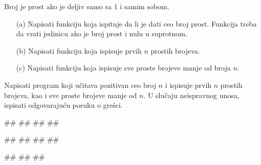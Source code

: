 \begin{Exercise}[label=FUN_08] 
Broj je prost ako je deljiv samo sa $1$ i samim sobom. 
\begin{itemize}
 \item [(a)] Napisati funkciju  koja ispituje da li je dati ceo
  broj prost. Funkcija treba da vrati jedinicu ako je broj prost i nulu u suprotnom.
 \item [(b)] Napisati funkciju  koja ispisuje prvih $n$ prostih brojeva.
 \item [(c)] Napisati funkciju  koja ispisuje
sve proste brojeve manje od broja $n$.
\end{itemize}
Napisati program koji učitava pozitivan ceo broj $n$ i ispisuje prvih $n$ prostih brojeva, kao i sve proste brojeve manje od $n$.
U slučaju neispravnog unosa, ispisati odgovarajuću poruku o grešci.

\begin{miditest}
\begin{upotreba}{1}
#\naslovInt#
##
##
##
\end{upotreba}
\end{miditest}
\begin{miditest}
\begin{upotreba}{2}
#\naslovInt#
##
##
##
\end{upotreba}
\end{miditest}

\begin{miditest}
\begin{upotreba}{3}
#\naslovInt#
##
##
\end{upotreba}
\end{miditest}

\end{Exercise}
\ifresenja 
\begin{Answer}[ref=FUN_08]
\end{Answer} 
\fi


